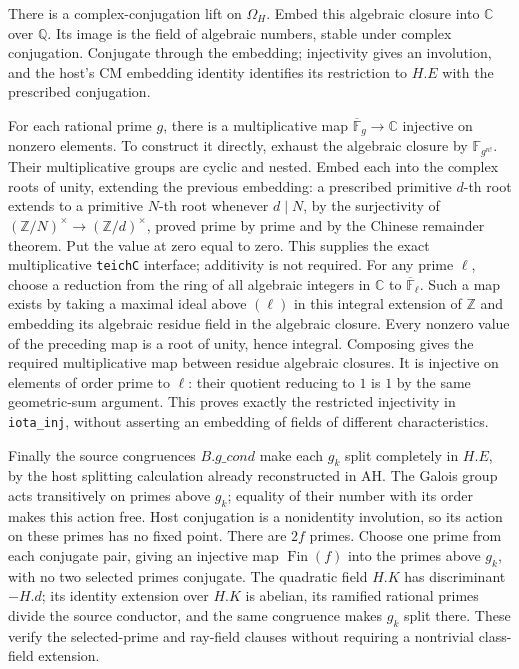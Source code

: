 There is a complex-conjugation lift on $\Omega_H$. Embed this
algebraic closure into $\mathbb C$ over $\mathbb Q$.
Its image is the field of algebraic numbers, stable under complex
conjugation. Conjugate through the embedding; injectivity gives
an involution, and the host's CM embedding identity identifies
its restriction to $H.E$ with the prescribed conjugation.

For each rational prime $g$, there is a multiplicative map
$\overline{\mathbb F}_g\to\mathbb C$ injective on nonzero
elements. To construct it directly, exhaust the algebraic closure
by $\mathbb F_{g^{n!}}$. Their multiplicative groups are cyclic
and nested. Embed each into the complex roots of unity, extending
the previous embedding: a prescribed primitive $d$-th root
extends to a primitive $N$-th root whenever $d\mid N$, by the
surjectivity of
$(\mathbb Z/N)^\times\to(\mathbb Z/d)^\times$, proved prime
by prime and by the Chinese remainder theorem. Put the value at
zero equal to zero. This supplies the exact multiplicative
\texttt{teichC} interface; additivity is not required.
For any prime $\ell$, choose a reduction from the ring of all
algebraic integers in $\mathbb C$ to
$\overline{\mathbb F}_\ell$. Such a map exists by taking a
maximal ideal above $(\ell)$ in this integral extension of
$\mathbb Z$ and embedding its algebraic residue field in the
algebraic closure. Every nonzero value of the preceding map is
a root of unity, hence integral. Composing gives the required
multiplicative map between residue algebraic closures. It is
injective on elements of order prime to $\ell$: their quotient
reducing to $1$ is $1$ by the same geometric-sum argument.
This proves exactly the restricted injectivity in
\texttt{iota\_inj}, without asserting an embedding of fields of
different characteristics.

Finally the source congruences $B.g\_cond$ make each $g_k$
split completely in $H.E$, by the host splitting calculation
already reconstructed in AH. The Galois group acts transitively
on primes above $g_k$; equality of their number with its order
makes this action free. Host conjugation is a nonidentity
involution, so its action on these primes has no fixed point.
There are $2f$ primes. Choose one prime from each conjugate pair,
giving an injective map $\operatorname{Fin}(f)$ into the primes
above $g_k$, with no two selected primes conjugate. The quadratic
field $H.K$ has discriminant $-H.d$; its identity extension over
$H.K$ is abelian, its ramified rational primes divide the source
conductor, and the same congruence makes $g_k$ split there.
These verify the selected-prime and ray-field clauses without
requiring a nontrivial class-field extension.

